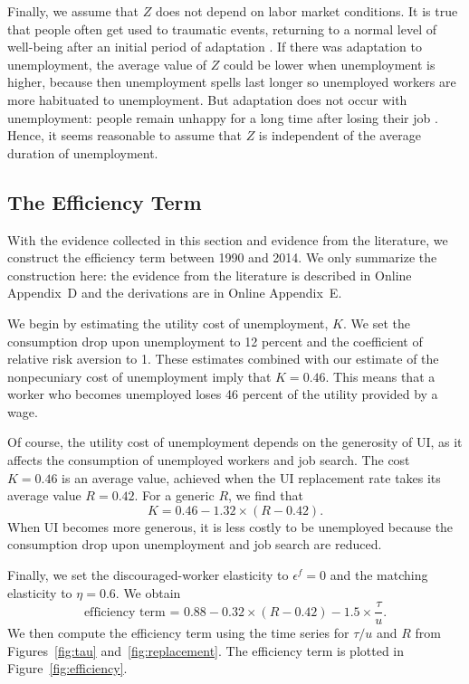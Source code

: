 \documentclass[letterpaper,12pt,leqno]{article}
\def \e{{\epsilon}}
\begin{document}
Finally, we assume that $Z$ does not depend on labor market conditions. It is true that people often get used to  traumatic events, returning to a normal level of well-being after an initial period of adaptation \citep[p.~429]{KKS04}. If there was adaptation to unemployment, the average value of $Z$ could be lower when unemployment is higher, because then unemployment spells last longer so unemployed workers are more habituated to unemployment. But adaptation does not occur with unemployment: people remain unhappy for a long time after losing their job \citep{WW98,LCG04}. Hence, it seems reasonable to assume that $Z$ is independent of the average duration of unemployment.

\subsection{The Efficiency Term}

With the evidence collected in this section and evidence from the literature, we construct the efficiency term between 1990 and 2014. We only summarize the construction here: the evidence from the literature is described in Online Appendix~D and the derivations are in Online Appendix~E.

We begin by estimating the utility cost of unemployment, $K$. We set the consumption drop upon unemployment to 12 percent and the coefficient of relative risk aversion to 1. These estimates combined with our estimate of the nonpecuniary cost of unemployment imply that $K = 0.46$. This means that a worker who becomes unemployed loses 46 percent of the utility provided by a wage.

Of course, the utility cost of unemployment depends on the generosity of UI, as it affects the consumption of unemployed workers and job search. The cost $K = 0.46$ is an average value, achieved when the UI replacement rate takes its average value $R=0.42$. For a generic $R$, we find that
\begin{equation}
K=0.46-1.32\times (R-0.42).
\label{eq:rulin}\end{equation}
When UI becomes more generous, it is less costly to be unemployed because the consumption drop upon unemployment and job search are reduced.

Finally, we set the discouraged-worker elasticity to $\e^{f}=0$ and the matching elasticity to $\eta=0.6$. We obtain
\begin{equation}
\text{efficiency term = }  0.88 - 0.32\times (R-0.42) - 1.5 \times \frac{\tau}{u}.
\label{eq:efflin}\end{equation}
We then compute the efficiency term using the time series for $\tau/u$ and $R$ from Figures~\ref{fig:tau} and~\ref{fig:replacement}. The efficiency term is plotted in Figure~\ref{fig:efficiency}.
\end{document}
